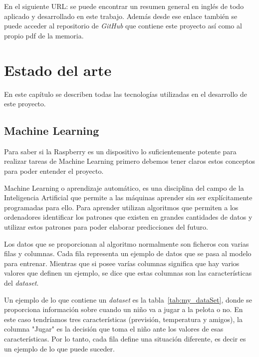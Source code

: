 \documentclass[a4paper, 12pt]{book}
\begin{document}
En el siguiente URL: se puede encontrar un resumen general en inglés de todo aplicado y desarrollado en este trabajo. Además desde ese enlace también se puede acceder al repositorio de \textit{GitHub} que contiene este proyecto así como al propio pdf de la memoria.

\cleardoublepage


\chapter{Estado del arte}               %
\label{chap:tecnologias}

En este capítulo se describen todas las tecnologías utilizadas en el desarrollo de este proyecto.

\section{Machine Learning}
\label{sec:machine_learning}

Para saber si la Raspberry es un dispositivo lo suficientemente potente para realizar tareas de Machine Learning primero debemos tener claros estos conceptos para poder entender el proyecto.

 Machine Learning o aprendizaje automático, es una disciplina del campo de la Inteligencia Artificial que permite a las máquinas aprender sin ser explícitamente programadas para ello. Para aprender utilizan algoritmos que permiten a los ordenadores identificar los patrones que existen en grandes cantidades de datos y utilizar estos patrones para poder elaborar predicciones del futuro. 
 
 Los datos que se proporcionan al algoritmo normalmente son ficheros con varias filas y columnas. Cada fila representa un ejemplo de datos que se pasa al modelo para entrenar. Mientras que si posee varías columnas significa que hay varios valores que definen un ejemplo, se dice que estas columnas son las características del \textit{dataset}. 
 
 Un ejemplo de lo que contiene un \textit{dataset} es la tabla~\ref{tab:my_dataSet}, donde se proporciona información sobre cuando un niño va a jugar a la pelota o no. En este caso tendríamos tres características (previsión, temperatura y amigos), la columna "Jugar" es la decisión que toma el niño ante los valores de esas características. Por lo tanto, cada fila define una situación diferente, es decir es un ejemplo de lo que puede suceder.
 
\end{document}
